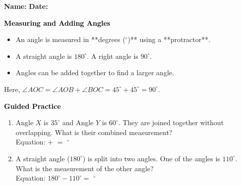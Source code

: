 \documentclass[12pt, letterpaper, fleqn]{article}
\newcommand{\blank}{\underline{\hspace{2.2cm}}}
\begin{document}
\textbf{Name:} \underline{\hspace{5cm}}
\hfill
\textbf{Date:} \underline{\hspace{3cm}}\\

\begin{tcolorbox}[colback=customteal!20]
    \large\textcolor{black}{\textbf{Measuring and Adding Angles}}
\end{tcolorbox}

\vspace{3mm}
\noindent
\begin{itemize}
    \item An angle is measured in **degrees ($^\circ$)** using a **protractor**.
    \item A straight angle is $180^\circ$. A right angle is $90^\circ$.
    \item Angles can be added together to find a larger angle.
\end{itemize}

\begin{center}
\end{center}
Here, $\angle AOC = \angle AOB + \angle BOC = 45^\circ + 45^\circ = 90^\circ$.

\newpage
\begin{tcolorbox}[colback=customteal!20]
    \large\textcolor{black}{\textbf{Guided Practice}}
\end{tcolorbox}

\vspace{5mm}
\begin{enumerate}[itemsep=3cm, leftmargin=0.6cm]
\item Angle $X$ is $35^\circ$ and Angle $Y$ is $60^\circ$. They are joined together without overlapping. What is their combined measurement?
\\
Equation: \blank $+$ \blank $=$ \blank $^\circ$

\item A straight angle ($180^\circ$) is split into two angles. One of the angles is $110^\circ$. What is the measurement of the other angle?
\\
Equation: $180^\circ - 110^\circ =$ \blank $^\circ$
\end{enumerate}
\end{document}
